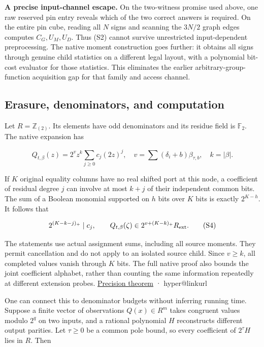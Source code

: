 \documentclass[11pt,a4paper]{article}
\makeatletter
\newcommand{\PaperSixCatalogue}[1]{\csname hyper@linkurl\endcsname{#1}{EVIDENCE_CATALOG.md}}
\newcommand{\PaperSixEvidence}[2]{\PaperSixCatalogue{#2}}
\makeatother
\begin{document}
\textbf{A precise input-channel escape.} On the two-witness promise used
above, one raw reserved pin entry reveals which of the two correct
answers is required. On the entire pin cube, reading all \(N\) signs and
scanning the \(3N/2\) graph edges computes \(C_G,U_M,U_D\). Thus (S2)
cannot survive unrestricted input-dependent preprocessing. The native
moment construction goes further: it obtains all signs through genuine
child statistics on a different legal layout, with a polynomial bit-cost
evaluator for those statistics. This eliminates the earlier
arbitrary-group-function acquisition gap for that family and access
channel.

\subsection{Erasure, denominators, and
computation}\label{v9-erasure-denominators-and-computation}

Let \(R=\mathbb Z_{(2)}\). Its elements have odd denominators and its
residue field is \(\mathbb F_2\). The native expansion has

\[
 Q_{t,\beta}(z)=2^v z^k\sum_{j\ge0}c_j(2z)^j,
 \quad v=\sum(\delta_i+b)\beta_{\tau,b},\quad k=|\beta|.
\]

If \(K\) original equality columns have no real shifted port at this
node, a coefficient of residual degree \(j\) can involve at most \(k+j\)
of their independent common bits. The sum of a Boolean monomial
supported on \(h\) bits over \(K\) bits is exactly \(2^{K-h}\). It
follows that

\[
 2^{(K-k-j)_+}\mid c_j,
 \qquad Q_{t,\beta}(\zeta)\in 2^{v+(K-k)_+}R_{\rm ext}.        \tag{S4}
\]

The statements use actual assignment sums, including all source moments.
They permit cancellation and do not apply to an isolated source child.
Since \(v\ge k\), all completed values vanish through \(K\) bits. The
full native proof also bounds the joint coefficient alphabet, rather
than counting the same information repeatedly at different extension
probes. \hyperref[v9-section-precision-frontier]{Precision theorem} ·
\PaperSixEvidence{evidence/research_v9/formal/BooleanSummation.lean}{Boolean-sum Lean proof}

One can connect this to denominator budgets without inferring running
time. Suppose a finite vector of observations \(Q(x)\in R^m\) takes
congruent values modulo \(2^q\) on two inputs, and a rational polynomial
\(H\) reconstructs different output parities. Let \(\tau\ge0\) be a
common pole bound, so every coefficient of \(2^\tau H\) lies in \(R\).
Then
\end{document}
